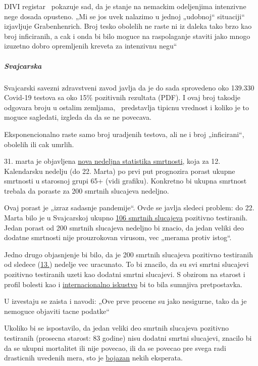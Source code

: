 DIVI registar ~pokazuje sad, da je stanje na nemackim odeljenjima
intenzivne nege dosada opusteno. „Mi se jos uvek nalazimo u jednoj
„udobnoj`` situaciji`` izjavljuje Grabenhenrich. Broj tesko obolelih ne
raste ni iz daleka tako brzo kao broj inficiranih, a cak i onda bi bilo
moguce na raspolaganje staviti jako mnogo izuzetno dobro opremljenih
kreveta za intenzivnu negu``

\hypertarget{svajcarska-1}{%
\subparagraph{\texorpdfstring{\textbf{Svajcarska}}{Svajcarska}}\label{svajcarska-1}}

Svajcarski savezni zdravstveni zavod javlja da je do sada sprovedeno oko
139.330 Covid-19 testova sa oko 15\% pozitivnih rezultata (PDF). I ovaj
broj takodje odgovara broju u ostalim zemljama, ~predstavlja tipicnu
vrednost i koliko je to moguce sagledati, izgleda da da se ne povecava.

Eksponencionalno raste samo broj uradjenih testova, ali ne i broj
„inficirani``, obolelih ili cak umrlih.

31. marta je objavljena
\href{https://www.bfs.admin.ch/bfs/de/home/statistiken/gesundheit/gesundheitszustand/sterblichkeit-todesursachen.html}{nova
nedeljna statistika smrtnosti}, koja za 12. Kalendarsku nedelju (do 22.
Marta) po prvi put prognozira porast ukupne smrtnosti u starosnoj grupi
65+ (vidi grafiku). Konkretno bi ukupna smrtnost trebala da poraste za
200 smrtnih slucajeva nedeljno.

Ovaj porast je „izraz sadasnje pandemije``. Ovde se javlja sledeci
problem: do 22. Marta bilo je u Svajcarskoj ukupno
\href{https://de.wikipedia.org/wiki/COVID-19-Pandemie_in_der_Schweiz\#Todesf\%C3\%A4lle}{106
smrtnih slucajeva} pozitivno testiranih. Jedan porast od 200 smrtnih
slucajeva nedeljno bi znacio, da jedan veliki deo dodatne smrtnosti nije
prouzrokovan virusom, vec „merama protiv istog``.

Jedno drugo objasnjenje bi bilo, da je 200 smrtnih slucajeva pozitivno
testiranih od sledece
(\href{https://de.wikipedia.org/wiki/COVID-19-Pandemie_in_der_Schweiz\#Todesf\%C3\%A4lle}{13.})
nedelje vec uracunato. To bi znacilo, da su svi smrtni slucajevi
pozitivno testiranih uzeti kao dodatni smrtni slucajevi. S obzirom na
starost i profil bolesti kao i
\href{https://swprs.org/rki-relativiert-corona-todesfaelle/}{internacionalno
iskustvo} bi to bila sumnjiva pretpostavka.

U izvestaju se zaista i navodi: „Ove prve procene su jako nesigurne,
tako da je nemoguce objaviti tacne podatke``

Ukoliko bi se ispostavilo, da jedan veliki deo smrtnih slucajeva
pozitivno testiranih (prosecna starost: 83 godine) nisu dodatni smrtni
slucajevi, znacilo bi da se ukupni mortalitet ili nije povecao, ili da
se povecao pre svega radi drasticnih uvedenih mera, sto je
\href{https://swprs.org/offener-brief-von-professor-sucharit-bhakdi-an-bundeskanzlerin-dr-angela-merkel/}{bojazan}
nekih eksperata.

